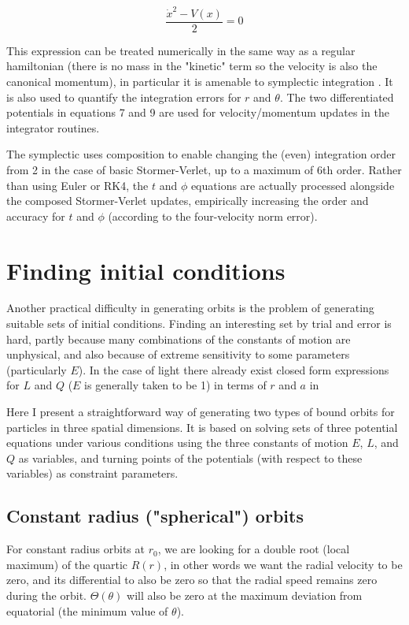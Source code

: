 \documentclass[11pt]{article}
\begin{document}
\begin{equation}
\frac {\dot x^2 - V(x)}{2} = 0
\end{equation}

This expression can be treated numerically in the same way as a regular hamiltonian (there is no mass in the "kinetic" term so the velocity is also the canonical momentum), in particular it is amenable to symplectic integration \cite{hairer}.
It is also used to quantify the integration errors for $r$ and $\theta$.
The two differentiated potentials in equations 7 and 9 are used for velocity/momentum updates in the integrator routines.

The symplectic uses composition \cite{hairer} to enable changing the (even) integration order from 2 in the case of basic Stormer-Verlet, up to a maximum of 6th order.
Rather than using Euler or RK4, the $t$ and $\phi$ equations are actually processed alongside the composed Stormer-Verlet updates, empirically increasing the order and accuracy for $t$ and $\phi$ (according to the four-velocity norm error).

\section{Finding initial conditions}

Another practical difficulty in generating orbits is the problem of generating suitable sets of initial conditions. Finding an interesting set by trial and error is hard, partly because many combinations of the constants of motion are unphysical, and also because of extreme sensitivity to some parameters (particularly $E$).
In the case of light there already exist closed form expressions for $L$ and $Q$ ($E$ is generally taken to be 1) in terms of $r$ and $a$ in \cite{teo}

Here I present a straightforward way of generating two types of bound orbits for particles in three spatial dimensions.
It is based on solving sets of three potential equations under various conditions using the three constants of motion $E$, $L$, and $Q$ as variables, and turning points of the potentials (with respect to these variables) as constraint parameters.

\subsection{Constant radius ("spherical") orbits}

For constant radius orbits at $r_0$, we are looking for a double root (local maximum) of the quartic $R(r)$, in other words we want the radial velocity to be zero, and its differential to also be zero so that the radial speed remains zero during the orbit.
$\Theta (\theta)$ will also be zero at the maximum deviation from equatorial (the minimum value of $\theta$).
\end{document}
